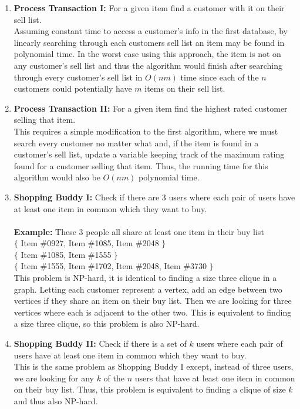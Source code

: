 \documentclass[12pt]{elsart}
\begin{document}
\begin{enumerate}
  \item {\bf Process Transaction I:} For a given item find a customer with it on their sell list.\\
  Assuming constant time to access a customer's info in the first database, by linearly searching through each customers sell list an item may be found in polynomial time. In the worst case using this approach, the item is not on any customer's sell list and thus the algorithm would finish after searching through every customer's sell list in $O(nm)$ time since each of the $n$ customers could potentially have $m$ items on their sell list.
  \item {\bf Process Transaction II:} For a given item find the highest rated customer selling that item.\\
  This requires a simple modification to the first algorithm, where we must search every customer no matter what and, if the item is found in a customer's sell list, update a variable keeping track of the maximum rating found for a customer selling that item. Thus, the running time for this algorithm would also be $O(nm)$ polynomial time.
  \item {\bf Shopping Buddy I:} Check if there are 3 users where each pair of users have at least one item in common which they want to buy. \\\\
{\bf Example:} These 3 people all share at least one item in their buy list\\
 $\{$ Item \#0927, Item \#1085, Item \#2048 $\}$\\
 $\{$ Item \#1085, Item \#1555 $\}$\\
 $\{$ Item \#1555, Item \#1702, Item \#2048, Item \#3730 $\}$\\
  This problem is NP-hard, it is identical to finding a size three clique in a graph. Letting each customer represent a vertex, add an edge between two vertices if they share an item on their buy list. Then we are looking for three vertices where each is adjacent to the other two. This is equivalent to finding a size three clique, so this problem is also NP-hard.

  \item {\bf Shopping Buddy II:} Check if there is a set of $k$ users where each pair of users have at least one item in common which they want to buy. \\
  This is the same problem as Shopping Buddy I except, instead of three users, we are looking for any $k$ of the $n$ users that have at least one item in common on their buy list. Thus, this problem is equivalent to finding a clique of size $k$ and thus also NP-hard.


\end{enumerate}
\end{document}
